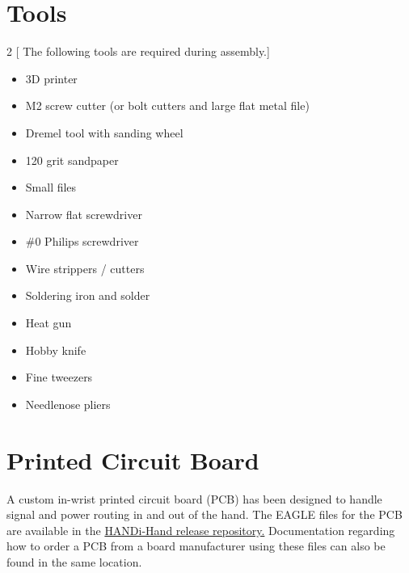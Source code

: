 \section{Tools}
\begin {multicols}{2}
[
The following tools are required during assembly.]
\begin{itemize}
\item 3D printer
\item M2 screw cutter (or bolt cutters and large flat metal file)
\item Dremel tool with sanding wheel
\item 120 grit sandpaper
\item Small files
\item Narrow flat screwdriver
\item \#0 Philips screwdriver
\item Wire strippers / cutters
\item Soldering iron and solder
\item Heat gun
\item Hobby knife
\item Fine tweezers
\item Needlenose pliers
\end{itemize}
\end{multicols}

\section{Printed Circuit Board}
A custom in-wrist printed circuit board (PCB) has been designed to handle signal and power routing in and out of the hand. The EAGLE files for the PCB are available in the \href{https://github.com/BLINCdev/HANDi-Hand}{HANDi-Hand release repository.} Documentation regarding how to order a PCB from a board manufacturer using these files can also be found in the same location.